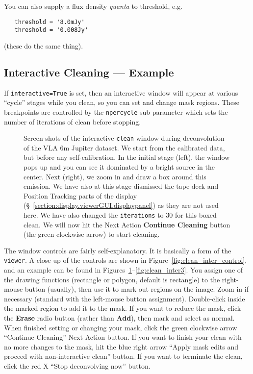 You can also supply a flux density {\em quanta} to threshold, e.g.
\small
\begin{verbatim}
   threshold = '8.0mJy'
   threshold = '0.008Jy'
\end{verbatim}
\normalsize
(these do the same thing).

\subsection{Interactive Cleaning --- Example}
\label{section:im.clean.exampleinteractive}

If {\tt interactive=True} is set, then an interactive window
will appear at various ``cycle'' stages while you clean, so you
can set and change mask regions.  These breakpoints are controlled
by the {\tt npercycle} sub-parameter which sets the number of
iterations of clean before stopping.

\begin{figure}[h!]
\begin{center}
\caption{\label{fig:clean_inter1} Screen-shots of the interactive 
{\tt clean} window during deconvolution of the VLA 6m Jupiter
dataset.  We start from the calibrated data, but before any 
self-calibration. In the initial stage (left), the window pops up 
and you can see it dominated by a bright source in the center.
Next (right), we zoom in and draw a box around this emission.
We have also at this stage dismissed the tape deck and Position
Tracking parts of the display 
(\S~\ref{section:display.viewerGUI.displaypanel}) 
as they are not used here.  We have also changed the 
{\tt iterations} to 30 for this boxed clean.
We will now hit the Next Action {\bf Continue Cleaning} button 
(the green clockwise arrow) to start cleaning. } 
\hrulefill
\end{center}
\end{figure}

The window controls are fairly self-explanatory.  It is basically a
form of the {\tt viewer}.  A close-up of the controls are shown in
Figure~\ref{fig:clean_inter_control}, and an example can be found in 
Figures~\ref{fig:clean_inter1}--\ref{fig:clean_inter3}.  
You assign one of the drawing functions
(rectangle or polygon, default is rectangle) to the right-mouse button
(usually), then use it to mark out regions on the image.  Zoom in if
necessary (standard with the left-mouse button assignment).
Double-click inside the marked region to add it to the mask.  If you
want to reduce the mask, click the {\bf Erase} radio button (rather
than {\bf Add}), then mark and select as normal.  
When finished setting or changing your mask, click the green
clockwise arrow ``Continue Cleaning'' Next Action button.  
If you want to finish your clean with
no more changes to the mask, hit the blue right arrow 
``Apply mask edits and proceed with non-interactive clean''
button.  If you want to terminate the clean, click the red X
``Stop deconvolving now'' button.

